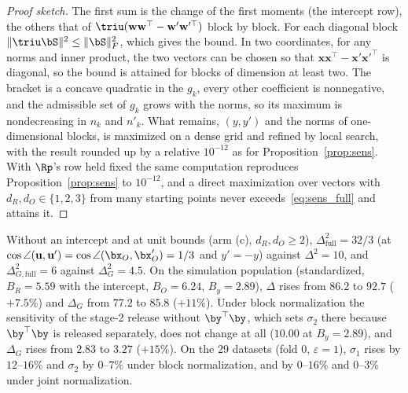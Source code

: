 \begin{proof}[Proof sketch]
The first sum is the change of the first moments (the intercept row), the others that of $\triu(\mathbf w\mathbf w^\top - \mathbf w'\mathbf w'^\top)$ block by block. For each diagonal block $\|\triu \bS\|^2 \le \|\bS\|_F^2$, which gives the bound. In two coordinates, for any norms and inner product, the two vectors can be chosen so that $\mathbf x\mathbf x^\top - \mathbf x'\mathbf x'^\top$ is diagonal, so the bound is attained for blocks of dimension at least two. The bracket is a concave quadratic in the $g_k$, every other coefficient is nonnegative, and the admissible set of $g_k$ grows with the norms, so its maximum is nondecreasing in $n_k$ and $n'_k$. What remains, $(y, y')$ and the norms of one-dimensional blocks, is maximized on a dense grid and refined by local search, with the result rounded up by a relative $10^{-12}$ as for Proposition~\ref{prop:sens}. With $\Rp$'s row held fixed the same computation reproduces Proposition~\ref{prop:sens} to $10^{-12}$, and a direct maximization over vectors with $d_R, d_O \in \{1, 2, 3\}$ from many starting points never exceeds~\eqref{eq:sens_full} and attains it.
\end{proof}

Without an intercept and at unit bounds (arm (c), $d_R, d_O \ge 2$), $\Delta_{\mathrm{full}}^2 = 32/3$ (at $\cos\angle(\mathbf u, \mathbf u') = \cos\angle(\bx_O, \bx'_O) = 1/3$ and $y' = -y$) against $\Delta^2 = 10$, and $\Delta_{G,\mathrm{full}}^2 = 6$ against $\Delta_G^2 = 4.5$. On the simulation population (standardized, $B_R = 5.59$ with the intercept, $B_O = 6.24$, $B_y = 2.89$), $\Delta$ rises from $86.2$ to $92.7$ ($+7.5\%$) and $\Delta_G$ from $77.2$ to $85.8$ ($+11\%$). Under block normalization the sensitivity of the stage-2 release without $\by^\top\by$, which sets $\sigma_2$ there because $\by^\top\by$ is released separately, does not change at all ($10.00$ at $B_y = 2.89$), and $\Delta_G$ rises from $2.83$ to $3.27$ ($+15\%$). On the 29 datasets (fold 0, $\varepsilon = 1$), $\sigma_1$ rises by $12$--$16\%$ and $\sigma_2$ by $0$--$7\%$ under block normalization, and by $0$--$16\%$ and $0$--$3\%$ under joint normalization.

